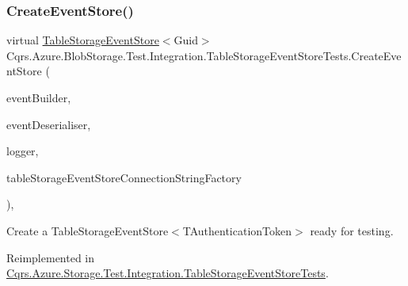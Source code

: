 \subsubsection{\texorpdfstring{Create\+Event\+Store()}{CreateEventStore()}}
{\footnotesize\ttfamily virtual \hyperlink{classCqrs_1_1Azure_1_1BlobStorage_1_1Events_1_1TableStorageEventStore}{Table\+Storage\+Event\+Store}$<$Guid$>$ Cqrs.\+Azure.\+Blob\+Storage.\+Test.\+Integration.\+Table\+Storage\+Event\+Store\+Tests.\+Create\+Event\+Store (\begin{DoxyParamCaption}\item[{\hyperlink{interfaceCqrs_1_1Events_1_1IEventBuilder}{I\+Event\+Builder}$<$ Guid $>$}]{event\+Builder,  }\item[{\hyperlink{interfaceCqrs_1_1Events_1_1IEventDeserialiser}{I\+Event\+Deserialiser}$<$ Guid $>$}]{event\+Deserialiser,  }\item[{I\+Logger}]{logger,  }\item[{\hyperlink{interfaceCqrs_1_1Azure_1_1BlobStorage_1_1ITableStorageStoreConnectionStringFactory}{I\+Table\+Storage\+Store\+Connection\+String\+Factory}}]{table\+Storage\+Event\+Store\+Connection\+String\+Factory }\end{DoxyParamCaption})\hspace{0.3cm}{\ttfamily [protected]}, {\ttfamily [virtual]}}



Create a Table\+Storage\+Event\+Store$<$\+T\+Authentication\+Token$>$ ready for testing. 



Reimplemented in \hyperlink{classCqrs_1_1Azure_1_1Storage_1_1Test_1_1Integration_1_1TableStorageEventStoreTests_aa7c476f27ce9940048ac7abde7cfabcb_aa7c476f27ce9940048ac7abde7cfabcb}{Cqrs.\+Azure.\+Storage.\+Test.\+Integration.\+Table\+Storage\+Event\+Store\+Tests}.

\mbox{\label{classCqrs_1_1Azure_1_1BlobStorage_1_1Test_1_1Integration_1_1TableStorageEventStoreTests_a0f88e64f7ff8f84b308d4a8c78222b7e_a0f88e64f7ff8f84b308d4a8c78222b7e}} 
